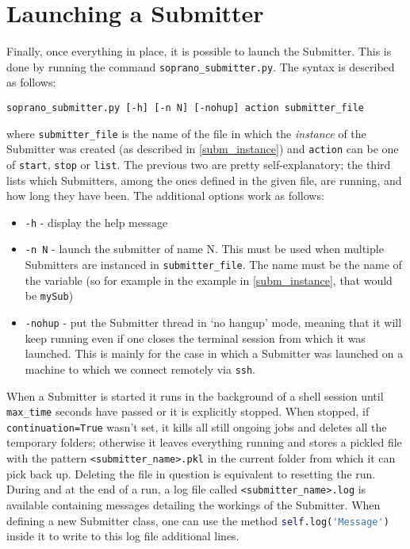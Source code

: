 \documentclass[]{report}
\begin{document}
\section{Launching a Submitter}

Finally, once everything in place, it is possible to launch the Submitter. This is done by running the command \lstinline|soprano_submitter.py|. The syntax is described as follows:

\begin{lstlisting}
soprano_submitter.py [-h] [-n N] [-nohup] action submitter_file
\end{lstlisting}

where \lstinline|submitter_file| is the name of the file in which the \textit{instance} of the Submitter was created (as described in \ref{subm_instance}) and \lstinline|action| can be one of \lstinline|start|, \lstinline|stop| or \lstinline|list|. The previous two are pretty self-explanatory; the third lists which Submitters, among the ones defined in the given file, are running, and how long they have been. The additional options work as follows:

\begin{itemize}
	\item \lstinline|-h| - display the help message
	\item \lstinline|-n N| - launch the submitter of name N. This must be used when multiple Submitters are instanced in \lstinline|submitter_file|. The name must be the name of the variable (so for example in the example in \ref{subm_instance}, that would be \lstinline|mySub|)
	\item \lstinline|-nohup| - put the Submitter thread in `no hangup' mode, meaning that it will keep running even if one closes the terminal session from which it was launched. This is mainly for the case in which a Submitter was launched on a machine to which we connect remotely via \lstinline|ssh|.
\end{itemize}

When a Submitter is started it runs in the background of a shell session until \lstinline|max_time| seconds have passed or it is explicitly stopped. When stopped, if \lstinline|continuation=True| wasn't set, it kills all still ongoing jobs and deletes all the temporary folders; otherwise it leaves everything running and stores a pickled file with the pattern \lstinline|<submitter_name>.pkl| in the current folder from which it can pick back up. Deleting the file in question is equivalent to resetting the run. During and at the end of a run, a log file called \lstinline|<submitter_name>.log| is available containing messages detailing the workings of the Submitter. When defining a new Submitter class, one can use the method \lstinline[language=python]|self.log('Message')| inside it to write to this log file additional lines.
\end{document}

